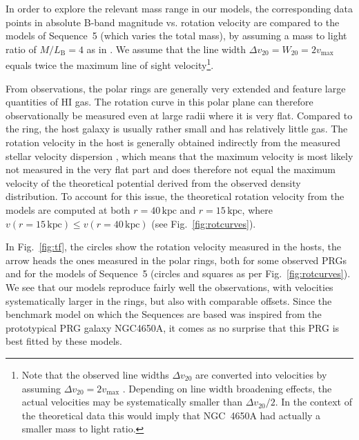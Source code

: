 \documentclass[useAMS,usenatbib]{mn2e}
\begin{document}
In order to explore the relevant mass range in our models, the corresponding data points in absolute B-band magnitude vs. rotation velocity are compared to the models of Sequence~5 (which varies the total mass), by assuming a mass to light ratio of $M/L_\text{B}=4$ as in \citet{CombesArnaboldi}. We assume that the line width $\Delta v_{20}=W_{20} = 2 v_\text{max}$ equals twice the maximum line of sight velocity\footnote{Note that the observed line widths $\Delta v_{20}$ are converted into velocities by assuming $\Delta v_{20} = 2v_\text{max}$ \citep[e.g.][]{Verheijen2001}. Depending on line width broadening effects, the actual velocities may be systematically smaller than $\Delta v_{20}/2$. In the context of the theoretical data this would imply that NGC~4650A had actually a smaller mass to light ratio.}.

From observations, the polar rings are generally very extended and feature large quantities of HI gas. The rotation curve in this polar plane can therefore observationally be measured even at large radii where it is very flat. Compared to the ring, the host galaxy is usually rather small and has relatively little gas. The rotation velocity in the host is generally obtained indirectly from the measured stellar velocity dispersion \citep{Iodice03,Iodice2006,Iodice2}, which means that the maximum velocity is most likely not measured in the very flat part and does therefore not equal the maximum velocity of the theoretical potential derived from the observed density distribution. To account for this issue, the theoretical rotation velocity from the models are computed at both $r=40\,\text{kpc}$ and $r=15\,\text{kpc}$, where $v(r=15\,\text{kpc}) \leq v(r=40\,\text{kpc})$ (see Fig.~\ref{fig:rotcurves}).

In Fig.~\ref{fig:tf}, the circles show the rotation velocity measured in the hosts, the arrow heads the ones measured in the polar rings, both for some observed PRGs and for the models of Sequence~5 (circles and squares as per Fig.~\ref{fig:rotcurves}). We see that our models reproduce fairly well the observations, with velocities systematically larger in the rings, but also with comparable offsets. Since the benchmark model on which the Sequences are based was inspired from the prototypical PRG galaxy NGC4650A, it comes as no surprise that this PRG is best fitted by these models.
\end{document}
